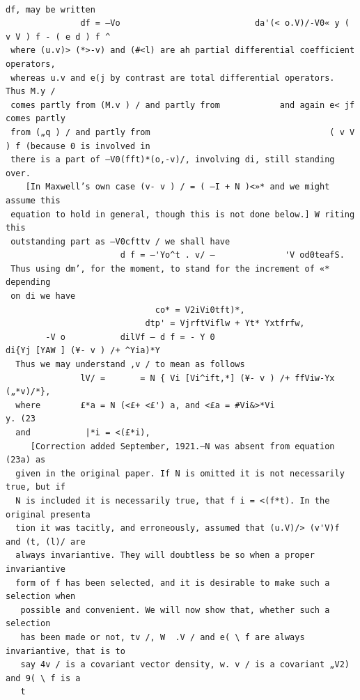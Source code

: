 \documentclass[10pt]{article}
\begin{document}
\begin{verbatim}
                                                                        df, may be written
               df = —Vo                           da'(< o.V)/-V0« y ( v V ) f - ( e d ) f ^
 where (u.v)> (*>-v) and (#<l) are ah partial differential coefficient operators,
 whereas u.v and e(j by contrast are total differential operators. Thus M.y /
 comes partly from (M.v ) / and partly from            and again e< jf comes partly
 from („q ) / and partly from                                    ( v V ) f (because 0 is involved in
 there is a part of —V0(fft)*(o,-v)/, involving di, still standing over.
    [In Maxwell’s own case (v- v ) / = ( —I + N )<»* and we might assume this
 equation to hold in general, though this is not done below.] W riting this
 outstanding part as —V0cfttv / we shall have
                       d f = —'Yo^t . v/ —              'V od0teafS.
 Thus using dm’, for the moment, to stand for the increment of «* depending
 on di we have
                              co* = V2iVi0tft)*,
                            dtp' = VjrftViflw + Yt* Yxtfrfw,
        -V o           dilVf — d f = - Y 0                               di{Yj [YAW ] (¥- v ) /+ ^Yia)*Y
  Thus we may understand ,v / to mean as follows
               lV/ =       = N { Vi [Vi^ift,*] (¥- v ) /+ ffViw-Yx („*v)/*},
  where        £*a = N (<£+ <£') a, and <£a = #Vi&>*Vi                          y. (23
  and           |*i = <(£*i),
     [Correction added September, 1921.—N was absent from equation (23a) as
  given in the original paper. If N is omitted it is not necessarily true, but if
  N is included it is necessarily true, that f i = <(f*t). In the original presenta­
  tion it was tacitly, and erroneously, assumed that (u.V)/> (v'V)f and (t, (l)/ are
  always invariantive. They will doubtless be so when a proper invariantive
  form of f has been selected, and it is desirable to make such a selection when
   possible and convenient. We will now show that, whether such a selection
   has been made or not, tv /, W  .V / and e( \ f are always invariantive, that is to
   say 4v / is a covariant vector density, w. v / is a covariant „V2) and 9( \ f is a
   t


\end{verbatim}
\clearpage
\end{document}
